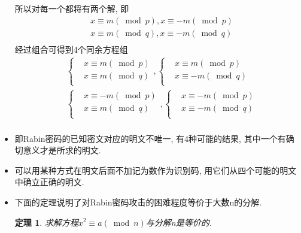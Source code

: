 \documentclass[UTF8]{ctexart}
\newtheorem{theorem}{\hspace{2em}定理}[section]
\begin{document}
\begin{itemize}
        所以对每一个都将有两个解, 即
        $$
        \begin{aligned}
            &x\equiv m(\bmod p), x\equiv -m(\bmod p)\\
            &x\equiv m(\bmod q), x\equiv -m(\bmod q)\\
        \end{aligned}
        $$
        经过组合可得到4个同余方程组
        $$
        \begin{aligned}
            &
            \left\{
                \begin{aligned}
                    &x\equiv m(\bmod p)\\
                    &x\equiv m(\bmod q)\\
                \end{aligned}
            \right. ,
            \left\{
            \begin{aligned}
                &x\equiv m(\bmod p)\\
                &x\equiv -m(\bmod q)\\
            \end{aligned}
            \right.\\
            &\left\{
            \begin{aligned}
                &x\equiv -m(\bmod p)\\
                &x\equiv m(\bmod q)\\
            \end{aligned}
            \right. ,
            \left\{
            \begin{aligned}
                &x\equiv -m(\bmod p)\\
                &x\equiv -m(\bmod q)\\
            \end{aligned}
            \right.\\
        \end{aligned}
        $$
        \item 即Rabin密码的已知密文对应的明文不唯一, 有4种可能的结果, 其中一个有确切意义才是所求的明文.
        \item 可以用某种方式在明文后面不加记为数作为识别码, 用它们从四个可能的明文中确立正确的明文.
        \item 下面的定理说明了对Rabin密码攻击的困难程度等价于大数n的分解.

        \begin{theorem}
            求解方程$x^2\equiv a(\bmod n)$与分解n是等价的.
        \end{theorem}
    \end{itemize}
\end{document}
